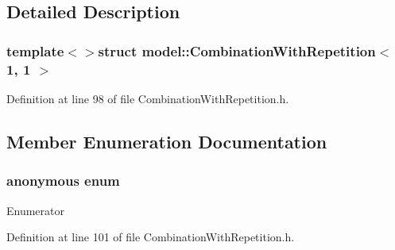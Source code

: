\subsection{Detailed Description}
\subsubsection*{template$<$$>$struct model\+::\+Combination\+With\+Repetition$<$ 1, 1 $>$}



Definition at line 98 of file Combination\+With\+Repetition.\+h.



\subsection{Member Enumeration Documentation}
\hypertarget{structmodel_1_1_combination_with_repetition_3_011_00_011_01_4_ab9acbc55796c36f436857ce3c2f2e5d8}{}\subsubsection[{anonymous enum}]{\setlength{\rightskip}{0pt plus 5cm}anonymous enum}\label{structmodel_1_1_combination_with_repetition_3_011_00_011_01_4_ab9acbc55796c36f436857ce3c2f2e5d8}
\begin{Desc}
\item[Enumerator]\par
\begin{description}
\item[{\em 
\hypertarget{structmodel_1_1_combination_with_repetition_3_011_00_011_01_4_ab9acbc55796c36f436857ce3c2f2e5d8a4cec2fa58d80aedf2a2a4d827c6f0461}{}N\label{structmodel_1_1_combination_with_repetition_3_011_00_011_01_4_ab9acbc55796c36f436857ce3c2f2e5d8a4cec2fa58d80aedf2a2a4d827c6f0461}
}]\end{description}
\end{Desc}


Definition at line 101 of file Combination\+With\+Repetition.\+h.

